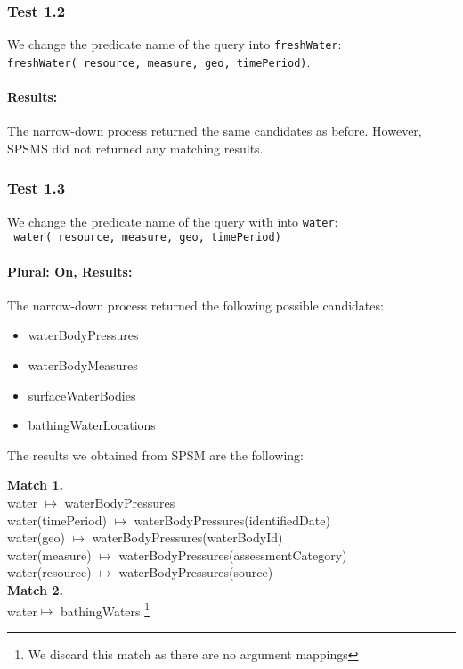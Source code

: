 \documentclass[a4paper,10pt]{article}
\begin{document}
\subsubsection{Test 1.2}
We change the predicate name of the query into \texttt{freshWater}:\\
\indent \texttt{freshWater( resource, measure, geo, timePeriod)}.

\paragraph{Results: } The narrow-down process returned the same candidates as before. 
However, SPSMS did not returned any matching results.


\subsubsection{Test 1.3}
We change the predicate name of the query with into \texttt{water}:\\
\indent \texttt{ water( resource, measure, geo, timePeriod)}

\paragraph{Plural: On, Results: } The narrow-down process returned the following possible candidates:

\begin{itemize}
\item waterBodyPressures
\item waterBodyMeasures
\item surfaceWaterBodies
\item bathingWaterLocations

\end{itemize}

The results we obtained from SPSM are the following: 


\textbf{Match 1.}\\
 water $\mapsto$ waterBodyPressures \\
water(timePeriod) $\mapsto$ waterBodyPressures(identifiedDate)\\
water(geo) $\mapsto$ waterBodyPressures(waterBodyId)\\
water(measure) $\mapsto$ waterBodyPressures(assessmentCategory)\\
water(resource) $\mapsto$ waterBodyPressures(source)\\

\textbf{Match 2.}\\
water$\mapsto$ bathingWaters \footnote{We discard this match as there are no argument mappings}
\end{document}
